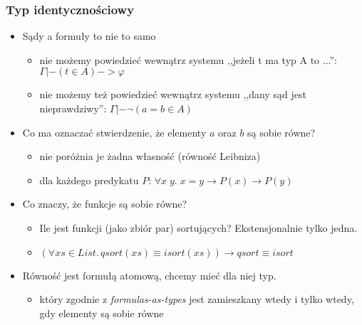 \documentclass{beamer}
\begin{document}
\begin{frame}
\frametitle{Typ identycznościowy}

\begin{itemize}
\item Sądy a formuły to nie to samo
\begin{itemize}
\item nie możemy powiedzieć wewnątrz systemu ,,jeżeli t ma typ A to ...'': $\Gamma |- (t \in A) -> \varphi$
\item nie możemy też powiedzieć wewnątrz systemu ,,dany sąd jest nieprawdziwy'': $\Gamma |- \neg (a = b \in A)$
\end{itemize}

\pause
\item Co ma oznaczać stwierdzenie, że elementy $a$ oraz $b$ są sobie równe?
\begin{itemize}
\item nie poróżnia je żadna własność (równość Leibniza)
\item dla każdego predykatu $P$: $\forall x\; y.\;  x=y \to P(x) \to P(y)$
\end{itemize}
\pause
\item Co znaczy, że funkcje są sobie równe?
\begin{itemize}
\item Ile jest funkcji (jako zbiór par) sortujących? Ekstensjonalnie tylko jedna.
\item $(\forall xs \in List.\,qsort(xs) \equiv isort(xs)) \to qsort \equiv isort$
\end{itemize}
\pause
\item Równość jest formułą atomową, chcemy mieć dla niej typ.
\begin{itemize}
\item który zgodnie z \emph{formulas-as-types} jest zamieszkany wtedy i tylko wtedy, gdy elementy są sobie równe
\end{itemize}

\end{itemize}

\end{frame}

\end{document}
